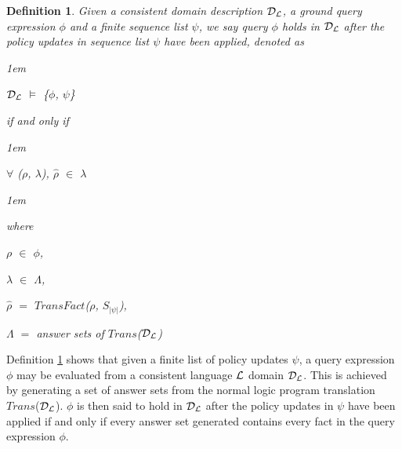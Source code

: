 \documentclass[11pt]{report}
\newtheorem{vdefinition}{Definition}[chapter]
\newenvironment{vquote}
{
  \begin{list}{}{\leftmargin 1em}\item[]
}
{
  \end{list}
}
\begin{document}
      \begin{vdefinition}
        \label{defn-langl-evalu}
        Given a consistent domain description ${\cal D}_{\cal L}$, a ground
        query expression $\phi$ and a finite sequence list $\psi$, we say
        {\em query $\phi$ holds in ${\cal D}_{\cal L}$ after the policy updates
        in sequence list $\psi$ have been applied}, denoted as

        \begin{vquote}
          ${\cal D}_{\cal L}$ $\models$ \{$\phi$, $\psi$\}
        \end{vquote}

        \noindent
        if and only if

        \begin{vquote}
          $\forall$ ($\rho$, $\lambda$),
          $\hat{\rho}$ $\in$ $\lambda$

        \end{vquote}

        \begin{vquote}
          where

          \hspace{1em}
          $\rho$ $\in$ $\phi$,

          \hspace{1em}
          $\lambda$ $\in$ $\Lambda$,

          \hspace{1em}
          $\hat{\rho}$ $=$ $TransFact$($\rho$, $S_{|\psi|}$),

          \hspace{1em}
          $\Lambda$ $=$ answer sets of $Trans$(${\cal D}_{\cal L}$)
        \end{vquote}
      \end{vdefinition}

      Definition \ref{defn-langl-evalu} shows that given a finite list of
      policy updates $\psi$, a query expression $\phi$ may be evaluated from a
      consistent language ${\cal L}$ domain ${\cal D_{L}}$. This is
      achieved by generating a set of answer sets from the normal logic
      program translation $Trans$(${\cal D_{L}}$). $\phi$ is then said to
      hold in ${\cal D_{L}}$ after the policy updates in $\psi$ have been
      applied if and only if every answer set generated contains every fact
      in the query expression $\phi$.
\end{document}

